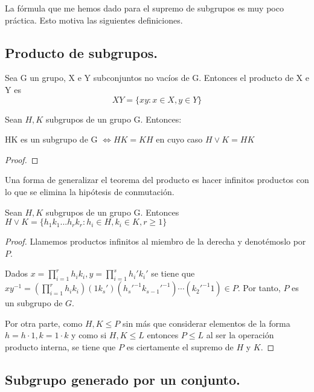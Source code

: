 La fórmula que me hemos dado para el supremo de subgrupos es muy poco práctica. Esto motiva las siguientes definiciones.

\subsection{Producto de subgrupos.}

\begin{definition}
Sea G un grupo, X e Y subconjuntos no vacíos de G. Entonces el producto de X e Y es
$$XY = \{xy:x \in X,y \in Y\}$$
\end{definition}

\begin{proposition}\label{theorem:teorema-producto}
Sean $H,K$ subgrupos de un grupo G. Entonces:

HK es un subgrupo de G $\iff HK = KH$
en cuyo caso $H \lor K = HK$
\end{proposition}

\begin{proof}

\end{proof}

Una forma de generalizar el teorema del producto es hacer infinitos productos con lo que se elimina la hipótesis de conmutación.

\begin{proposition}
Sean $H,K$ subgrupos de un grupo G. Entonces $H \lor K = \{h_1k_1...h_rk_r: h_i \in H,k_i \in K,r \ge 1\}$
\end{proposition}
\begin{proof}
Llamemos productos infinitos al miembro de la derecha y denotémoslo por $P$.

Dados $x = \prod_{i = 1}^r h_ik_i, y = \prod_{i = 1}^s h_i'k_i'$ se tiene que $xy^{-1} = (\prod_{i = 1}^r h_ik_i)(1k_s')(h_s'^{-1}k_{s-1}'^{-1})\cdots(k_2'^{-1}1) \in P$. Por tanto, $P$ es un subgrupo de $G$. 

Por otra parte, como $H,K \le P$ sin más que considerar elementos de la forma $h = h \cdot 1,k = 1 \cdot k$ y como si $H,K \le L$ entonces $P \le L$ al ser la operación producto interna, se tiene que $P$ es ciertamente el supremo de $H$ y $K$.  
\end{proof}

\subsection{Subgrupo generado por un conjunto.}

